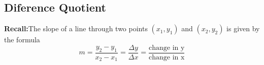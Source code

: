 \documentclass[11pt]{article}
\begin{document}
\begin{enumerate}
\noindent {} \hspace{1in} 

\newpage

\section{Diference Quotient}

\textbf{Recall:}The slope of a line through two points $(x_1, y_1)$ and $(x_2, y_2)$ is given by the formula
$$m=\frac{y_2-y_1}{x_2-x_1}=\frac{\Delta y}{\Delta x}=\frac{\text{change in y}}{\text{change in x}}$$



\end{enumerate}
\end{document}
